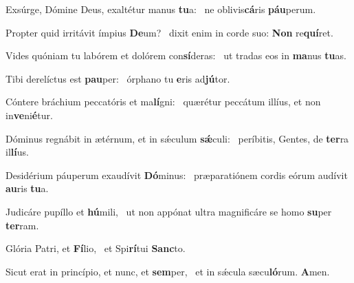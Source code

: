 \item Exsúrge, Dómine Deus, exaltétur manus \textbf{tu}a:~\psstar{} ne oblivis\textbf{cá}ris \textbf{páu}perum.
\item Propter quid irritávit ímpius \textbf{De}um?~\psstar{} dixit enim in corde suo: \textbf{Non} re\textbf{quí}ret.
\item Vides quóniam tu labórem et dolórem con\textbf{sí}deras:~\psstar{} ut tradas eos in \textbf{ma}nus \textbf{tu}as.
\item Tibi derelíctus est \textbf{pau}per:~\psstar{} órphano tu \textbf{e}ris ad\textbf{jú}tor.
\item Cóntere bráchium peccatóris et ma\textbf{lí}gni:~\psstar{} quærétur peccátum illíus, et non in\textbf{ve}ni\textbf{é}tur.
\item Dóminus regnábit in ætérnum, et in sǽculum \textbf{sǽ}culi:~\psstar{} períbitis, Gentes, de \textbf{ter}ra il\textbf{lí}us.
\item Desidérium páuperum exaudívit \textbf{Dó}minus:~\psstar{} præparatiónem cordis eórum audívit \textbf{au}ris \textbf{tu}a.
\item Judicáre pupíllo et \textbf{hú}mili,~\psstar{} ut non appónat ultra magnificáre se homo \textbf{su}per \textbf{ter}ram.
\item Glória Patri, et \textbf{Fí}lio,~\psstar{} et Spi\textbf{rí}tui \textbf{Sanc}to.
\item Sicut erat in princípio, et nunc, et \textbf{sem}per,~\psstar{} et in sǽcula sæcu\textbf{ló}rum. \textbf{A}men.
